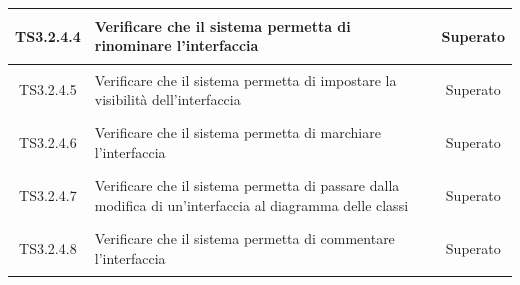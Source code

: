 \documentclass[../PianoDiQualifica.tex]{subfiles}
\begin{document}
\begin{longtable}{|c|>{\centering}p{10cm}|c|}
	\hline
	\hypertarget{TS3.2.4.4}{TS3.2.4.4} & Verificare che il sistema permetta di rinominare l'interfaccia & Superato \\
	\hline
	\hypertarget{TS3.2.4.5}{TS3.2.4.5} & Verificare che il sistema permetta di impostare la visibilità dell'interfaccia & Superato \\
	\hline
	\hypertarget{TS3.2.4.6}{TS3.2.4.6} & Verificare che il sistema permetta di marchiare l'interfaccia & Superato \\
	\hline
	\hypertarget{TS3.2.4.7}{TS3.2.4.7} & Verificare che il sistema permetta di passare dalla modifica di un'interfaccia al diagramma delle classi & Superato \\
	\hline
	\hypertarget{TS3.2.4.8}{TS3.2.4.8} & Verificare che il sistema permetta di commentare l'interfaccia & Superato \\

	

\end{longtable}
\end{document}
